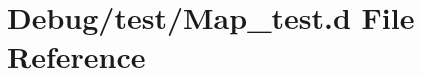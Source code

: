 \hypertarget{_map__test_8d}{}\section{Debug/test/\+Map\+\_\+test.d File Reference}
\label{_map__test_8d}
